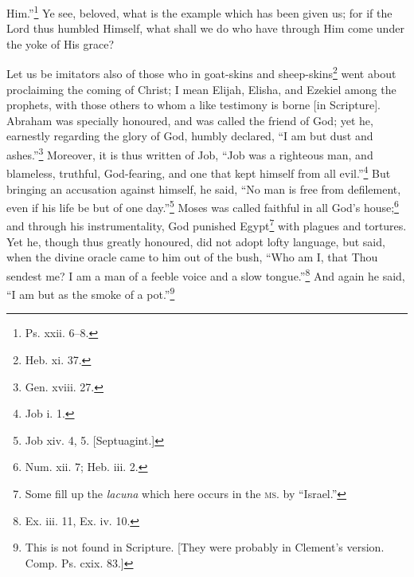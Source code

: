 Him.”\footnote{Ps. xxii. 6–8.} Ye see, beloved, what is the example which has been given us; for if the Lord thus humbled Himself, what shall we do who have through Him come under the yoke of His grace?


Let us be imitators also of those who in goat-skins and sheep-skins\footnote{Heb. xi. 37.} went about proclaiming the coming of Christ; I mean Elijah, Elisha, and Ezekiel among the prophets, with those others to whom a like testimony is borne [in Scripture]. Abraham was specially honoured, and was called the friend of God; yet he, earnestly regarding the glory of God, humbly declared, “I am but dust and ashes.”\footnote{Gen. xviii. 27.} Moreover, it is thus written of Job, “Job was a righteous man, and blameless, truthful, God-fearing, and one that kept himself from all evil.”\footnote{Job i. 1.} But bringing an accusation  against himself, he said, “No man is free from defilement, even if his life be but of one day.”\footnote{Job xiv. 4, 5. [Septuagint.]} Moses was called faithful in all God’s house;\footnote{Num. xii. 7; Heb. iii. 2.} and through his instrumentality, God punished Egypt\footnote{Some fill up the \emph{lacuna} which here occurs in the \textsc{ms.} by “Israel.”} with plagues and tortures. Yet he, though thus greatly honoured, did not adopt lofty language, but said, when the divine oracle came to him out of the bush, “Who am I, that Thou sendest me? I am a man of a feeble voice and a slow tongue.”\footnote{Ex. iii. 11, Ex. iv. 10.} And again he said, “I am but as the smoke of a pot.”\footnote{This is not found in Scripture. [They were probably in Clement’s version. Comp. Ps. cxix. 83.]}


